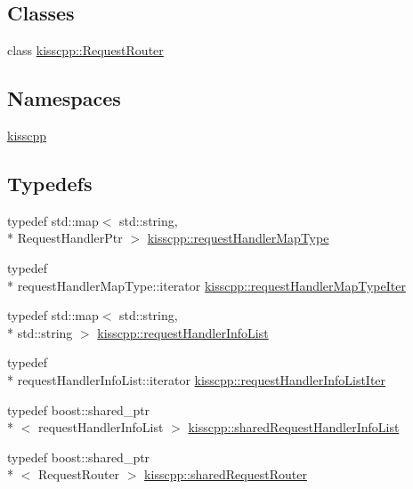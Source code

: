 \subsection*{Classes}
\begin{DoxyCompactItemize}
\item 
class \hyperlink{a00038}{kisscpp\-::\-Request\-Router}
\end{DoxyCompactItemize}
\subsection*{Namespaces}
\begin{DoxyCompactItemize}
\item 
\hyperlink{a00089}{kisscpp}
\end{DoxyCompactItemize}
\subsection*{Typedefs}
\begin{DoxyCompactItemize}
\item 
typedef std\-::map$<$ std\-::string, \\*
Request\-Handler\-Ptr $>$ \hyperlink{a00089_acaaba8d5ee3dd772dbf008749245c357}{kisscpp\-::request\-Handler\-Map\-Type}
\item 
typedef \\*
request\-Handler\-Map\-Type\-::iterator \hyperlink{a00089_acb02d872f8089cccfccea0cbf2191a76}{kisscpp\-::request\-Handler\-Map\-Type\-Iter}
\item 
typedef std\-::map$<$ std\-::string, \\*
std\-::string $>$ \hyperlink{a00089_a403fe12b3fa48680ec27f8af4286383b}{kisscpp\-::request\-Handler\-Info\-List}
\item 
typedef \\*
request\-Handler\-Info\-List\-::iterator \hyperlink{a00089_a9b5b819d32c8f71acb0a5b292303b8e1}{kisscpp\-::request\-Handler\-Info\-List\-Iter}
\item 
typedef boost\-::shared\-\_\-ptr\\*
$<$ request\-Handler\-Info\-List $>$ \hyperlink{a00089_aa107348bd263ff2c9358b497155d37b8}{kisscpp\-::shared\-Request\-Handler\-Info\-List}
\item 
typedef boost\-::shared\-\_\-ptr\\*
$<$ Request\-Router $>$ \hyperlink{a00089_a203bb476deb3940ecd3f21668dd3cdff}{kisscpp\-::shared\-Request\-Router}
\end{DoxyCompactItemize}
